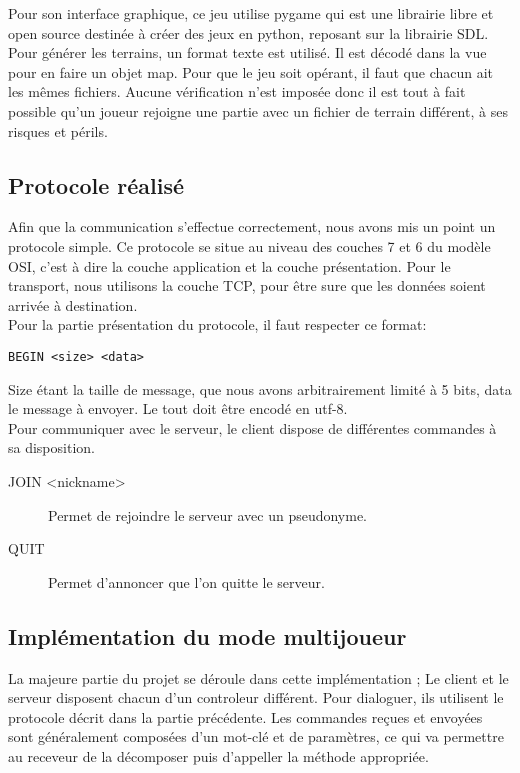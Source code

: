 \documentclass[12pt]{article}
\begin{document}
Pour son interface graphique, ce jeu utilise pygame qui est une librairie libre et open source destinée à créer des jeux en python, reposant sur la librairie SDL.
\\

Pour générer les terrains, un format texte est utilisé. Il est décodé dans la vue pour en faire un objet map. Pour que le jeu soit opérant, il faut que chacun ait les mêmes fichiers. Aucune vérification n'est imposée donc il est tout à fait possible qu'un joueur rejoigne une partie avec un fichier de terrain différent, à ses risques et périls.
\subsection{Protocole réalisé}
Afin que la communication s'effectue correctement, nous avons mis un point un protocole simple.
Ce protocole se situe au niveau des couches 7 et 6 du modèle OSI, c'est à dire la couche application et la couche présentation. Pour le transport, nous utilisons la couche TCP, pour être sure que les données soient arrivée à destination.
\\
Pour la partie présentation du protocole, il faut respecter ce format:\\
\begin{lstlisting}
BEGIN <size> <data>
\end{lstlisting}
Size étant la taille de message, que nous avons arbitrairement limité à 5 bits,
data le message à envoyer.
Le tout doit être encodé en utf-8.
\\
Pour communiquer avec le serveur, le client dispose de différentes commandes à sa disposition.\\
\begin{description}
\item[JOIN <nickname>] Permet de rejoindre le serveur avec un pseudonyme.
\item[QUIT] Permet d'annoncer que l'on quitte le serveur.
\end{description}


\subsection{Implémentation du mode multijoueur}

La majeure partie du projet se déroule dans cette implémentation ; Le client et le serveur disposent chacun d'un controleur différent. Pour dialoguer, ils utilisent le protocole décrit dans la partie précédente. Les commandes reçues et envoyées sont généralement composées d'un mot-clé et de paramètres, ce qui va permettre au receveur de la décomposer puis d'appeller la méthode appropriée.
\\
\end{document}

